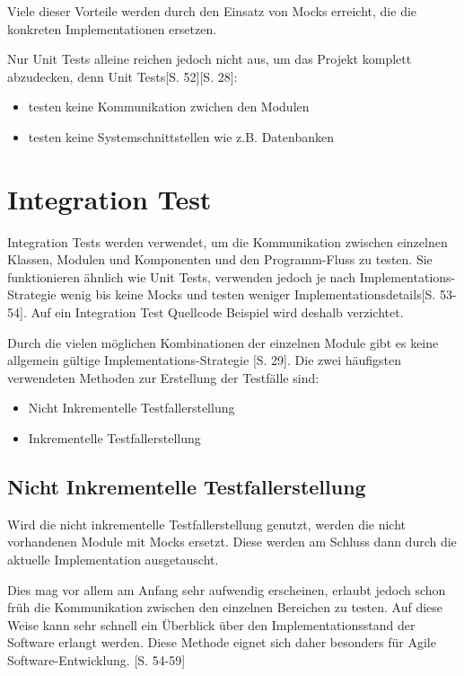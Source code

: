 \documentclass[a4paper,bibtotoc,oneside]{scrbook}
\begin{document}
Viele dieser Vorteile werden durch den Einsatz von Mocks erreicht, die die konkreten Implementationen ersetzen.

Nur Unit Tests alleine reichen jedoch nicht aus, um das Projekt komplett abzudecken, denn Unit Tests\cite{test_large_systems}[S. 52]\cite{betrieb}[S. 28]:

\begin{itemize}
  \item testen keine Kommunikation zwichen den Modulen
  \item testen keine Systemschnittstellen wie z.B. Datenbanken
\end{itemize}

\chapter{Integration Test}
Integration Tests werden verwendet, um die Kommunikation zwischen einzelnen Klassen, Modulen und Komponenten und den Programm-Fluss zu testen. Sie funktionieren ähnlich wie Unit Tests, verwenden jedoch je nach Implementations-Strategie wenig bis keine Mocks und testen weniger Implementationsdetails\cite{test_large_systems}[S. 53-54]. Auf ein Integration Test Quellcode Beispiel wird deshalb verzichtet. 

Durch die vielen möglichen Kombinationen der einzelnen Module gibt es keine allgemein gültige Implementations-Strategie \cite{betrieb}[S. 29]. Die zwei häufigsten verwendeten Methoden zur Erstellung der Testfälle sind:

\begin{itemize}
	\item Nicht Inkrementelle Testfallerstellung
	\item Inkrementelle Testfallerstellung
\end{itemize}

\section{Nicht Inkrementelle Testfallerstellung}
Wird die nicht inkrementelle Testfallerstellung genutzt, werden die nicht vorhandenen Module mit Mocks ersetzt. Diese werden am Schluss dann durch die aktuelle Implementation ausgetauscht.

Dies mag vor allem am Anfang sehr aufwendig erscheinen, erlaubt jedoch schon früh die Kommunikation zwischen den einzelnen Bereichen zu testen. Auf diese Weise kann sehr schnell ein Überblick über den Implementationsstand der Software erlangt werden. Diese Methode eignet sich daher besonders für Agile Software-Entwicklung. \cite{test_large_systems}[S. 54-59] 
\end{document}
